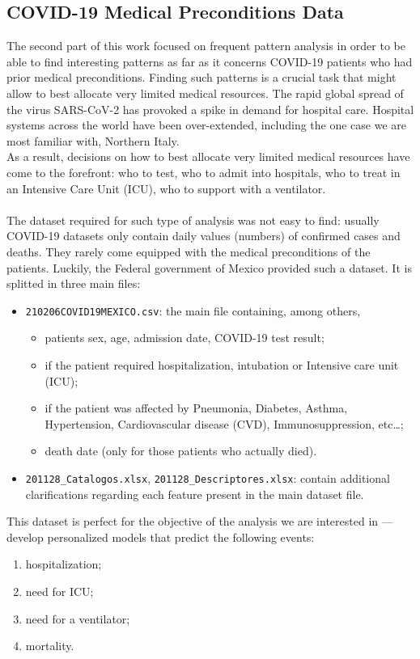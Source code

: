 \documentclass[11pt,a4paper]{article}
\begin{document}
\subsection{COVID-19 Medical Preconditions Data}
The second part of this work focused on frequent pattern analysis in order to be
able to find interesting patterns as far as it concerns COVID-19 patients who
had prior medical preconditions. Finding such patterns is a crucial task that
might allow to best allocate very limited medical resources. The rapid global
spread of the virus SARS-CoV-2 has provoked a spike in demand for hospital care.
Hospital systems across the world have been over-extended, including the one
case we are most familiar with, Northern Italy.\\
As a result, decisions on how to best allocate very limited medical resources
have come to the forefront: who to test, who to admit into hospitals, who to
treat in an Intensive Care Unit (ICU), who to support with a ventilator.\\
\\
The dataset required for such type of analysis was not easy to find: usually
COVID-19 datasets only contain daily values (numbers) of confirmed cases and
deaths. They rarely come equipped with the medical preconditions of the
patients. Luckily, the Federal government of Mexico\cite{mexico} provided such a
dataset. It is splitted in three main files:
\begin{itemize}
    \item \texttt{210206COVID19MEXICO.csv}: the main file containing, among
    others,
    \begin{itemize}
        \item patients sex, age, admission date, COVID-19 test result;
        \item if the patient required hospitalization, intubation or Intensive
        care unit (ICU);
        \item if the patient was affected by Pneumonia, Diabetes, Asthma,
        Hypertension, Cardiovascular disease (CVD), Immunosuppression, etc\dots;
        \item death date (only for those patients who actually died).
    \end{itemize}
    \item \texttt{201128\_Catalogos.xlsx}, \texttt{201128\_Descriptores.xlsx}:
    contain additional clarifications regarding each feature present in the main
    dataset file.
\end{itemize}
This dataset is perfect for the objective of the analysis we are interested in
--- develop personalized models that predict the following events:
\begin{enumerate}
    \item hospitalization;
    \item need for ICU;
    \item need for a ventilator;
    \item mortality.
\end{enumerate}
\end{document}
